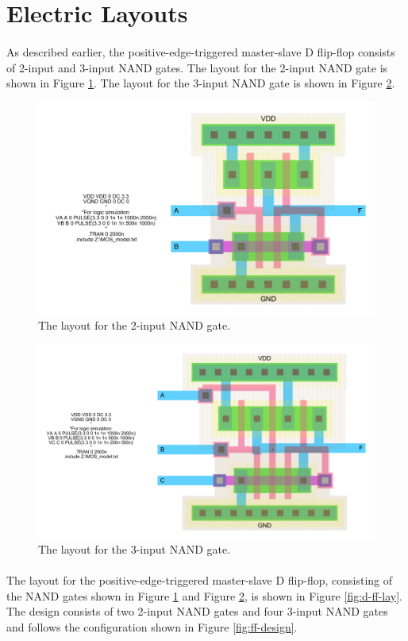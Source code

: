 \documentclass{article}
\begin{document}
\section{Electric Layouts}
  \paragraph{}
  As described earlier, the positive-edge-triggered master-slave D flip-flop consists of 2-input and 3-input NAND gates. The layout for the 2-input NAND gate is shown in Figure \ref{fig:2-input-nand-lay}. The layout for the 3-input NAND gate is shown in Figure \ref{fig:3-input-nand-lay}.


  \begin{figure}[H]
    \centering
    \includegraphics[width=0.7\linewidth, frame]{screenshots/2-input-nand-lay.png}
    \caption{The layout for the 2-input NAND gate.}
    \label{fig:2-input-nand-lay}
  \end{figure}

  \begin{figure}[H]
    \centering
    \includegraphics[width=0.7\linewidth, frame]{screenshots/3-input-nand-lay.png}
    \caption{The layout for the 3-input NAND gate.}
    \label{fig:3-input-nand-lay}
  \end{figure}


  \paragraph{}
  The layout for the positive-edge-triggered master-slave D flip-flop, consisting of the NAND gates shown in Figure \ref{fig:2-input-nand-lay} and Figure \ref{fig:3-input-nand-lay}, is shown in Figure \ref{fig:d-ff-lay}. The design consists of two 2-input NAND gates and four 3-input NAND gates and follows the configuration shown in Figure \ref{fig:ff-design}.
\end{document}
